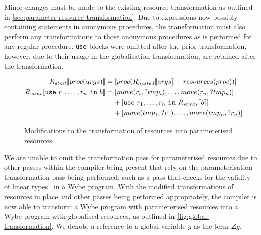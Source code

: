 Minor changes must be made to the existing resource transformation as outlined in \cref{sec:parameter-resource-transformation}. Due to expressions now possibly containing statements in anonymous procedures, the transformation must also perform any transformations to those anonymous procedures as is performed for any regular procedure. \texttt{use} blocks were omitted after the prior transformation, however, due to their usage in the globalisation transformation, are retained after the transformation.

\begin{figure}[ht]
  \centering
  \begin{align*}
    R_{stmt}\bbrackets*{proc(args)} &= [proc(R_{nested}\bbrackets*{args} + \mathop{resources}(proc))] \\
    R_{stmt}\bbrackets*{\mathtt{use}\ r_1, \dots, r_n\ \mathtt{in}\ b} &= [move(r_i, ?tmp_i), \dots, move(r_n, ?tmp_n)] \\
      &\phantom{= }\ + [\mathtt{use}\ r_1, \dots, r_n\ \mathtt{in}\ R_{stmts}\bbrackets*{b}] \\
      &\phantom{= }\ + [move(tmp_1, ?r_1), \dots, move(tmp_n, ?r_n)]
  \end{align*}
  \caption{Modifications to the transformation of resources into parameterised resources.}
  \label{fig:modified-resource-transformation}
\end{figure}

We are unable to omit the transformation pass for parameterised resources due to other passes within the compiler being present that rely on the parameterisation transformation pass being performed, such as a pass that checks for the validity of linear types~\cite{pierce2002types} in a Wybe program. With the modified transformations of resources in place and other passes being performed appropriately, the compiler is now able to transform a Wybe program with parameterised resources into a Wybe program with globalised resources, as outlined in \cref{fig:global-transformation}. We denote a reference to a global variable $g$ as the term $\angles{g}$.

